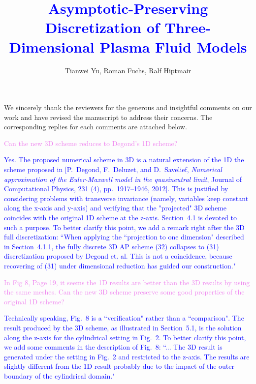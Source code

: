 \documentclass[12pt]{journalrebuttal}
\title{\textcolor{blue}{Asymptotic-Preserving Discretization of Three-Dimensional Plasma Fluid Models}}
\author{Tianwei Yu, Roman Fuchs, Ralf Hiptmair}
\begin{document}
\maketitle

We sincerely thank the reviewers for the generous and insightful comments on our work and have revised the manuscript to address their concerns. The corresponding replies for each comments are attached below.
\nextreviewer
\begin{revcomment}
    \textcolor{violet}{Can the new 3D scheme reduces to Degond's 1D scheme?}
\end{revcomment} 
    \begin{response}
    \textcolor{blue}{
    Yes. The proposed numerical scheme in 3D is a natural extension of the 1D
    the scheme proposed in $[$P.~Degond, F.~Deluzet, and D.~Savelief, \emph{Numerical approximation 
    of the Euler-Maxwell model in the quasineutral limit}, Journal of Computational Physics, 231 (4), 
    pp.~1917--1946, 2012$]$. This is justified by considering problems with
    transverse invariance (namely, variables keep constant along the x-axis and y-axis) and
    verifying that the "projected" 3D scheme coincides with the original 1D scheme at the z-axis.
    Section~4.1 is devoted to such a purpose. To better clarify this point, we add a remark
    right after the 3D full discretization: ``When applying the ``projection to one dimension"
    described in Section~4.1.1, the fully discrete 3D AP scheme (32) collapses to (31)
    discretization proposed by Degond et. al. This is not a coincidence, because
    recovering of (31) under dimensional reduction has guided our construction."
    }
\end{response}


\begin{revcomment}
    \textcolor{violet}{
    In Fig 8, Page 19, it seems the 1D results are better 
    than the 3D results by using the same meshes. Can the new 3D scheme
    preserve some good properties of the original 1D scheme?
    }
\end{revcomment}
\begin{response}
    \textcolor{blue}{
    Technically speaking, Fig.~8 is a ``verification" rather than a ``comparison".
    The result produced by the 3D scheme, as illustrated in Section~5.1, is the
    solution along the z-axis for the cylindrical setting in Fig.~2. To better
    clarify this point, we add some comments in the description of Fig.~8:
    ``... The 3D result is generated under the setting in Fig.~2
    and restricted to the z-axis. The results are slightly different from
    the 1D result probably due to the impact of the outer boundary of the
    cylindrical domain."
    }
\end{response}
\end{document}
